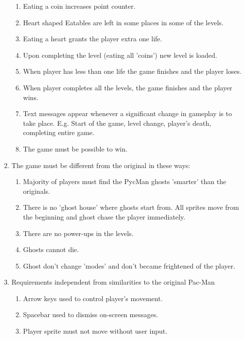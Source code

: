 \documentclass[11pt,a4paper]{report}
\begin{document}
\begin{enumerate}
\begin{enumerate}
					\item
						Eating a coin increases point counter.
						\label{req-point++}
					\item
						Heart shaped Eatables are left in some places in some of the levels.
						\label{req-hearts}
					\item
						Eating a heart grants the player extra one life.
						\label{req-lifes++}
					\item
						Upon completing the level (eating all 'coins') new level is loaded.
						\label{req-level-up}
					\item
						When player has less than one life the game finishes and the player loses.
						\label{req-game-over}
					\item
						When player completes all the levels, the game finishes and the player wins.
						\label{req-win}
					\item
						Text messages appear whenever a significant change in gameplay is to take place.
						E.g. Start of the game, level change, player's death, completing entire game.
						\label{req-messages}
					\item
						The game must be possible to win.
						\label{req-winnable}
				\end{enumerate}
				\item
					The game must be different from the original in these ways:
					\begin{enumerate}
						\item
							Majority of players must find the PycMan ghosts 'smarter' than the originals.
							\label{smarterghosts}
						\item
							There is no 'ghost house' where ghosts start from. All sprites move from the beginning and ghost chase the player immediately.
						\item
							There are no power-ups in the levels.
						\item
							Ghosts cannot die.
						\item
							Ghost don't change 'modes' and don't became frightened of the player.
					\end{enumerate}
				\item 
					Requirements independent from similarities to the original Pac-Man
					\begin{enumerate}
						\item
							Arrow keys used to control player's movement.
						\item
							Spacebar used to dismiss on-screen messages.
						\item
							Player sprite must not move without user input.
						

\end{enumerate}
\end{enumerate}
\end{document}
